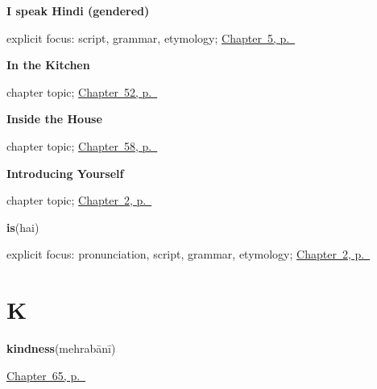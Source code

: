 \noindent\begin{minipage}[t]{\linewidth}
\raggedright
\textbf{I speak Hindi (gendered)}\enspace\emph{   }\par
\footnotesize explicit focus: script, grammar, etymology; \hyperref[ch:first-verbs]{Chapter~5, p.~\pageref*{ch:first-verbs}}
\end{minipage}\par\smallskip

\noindent\begin{minipage}[t]{\linewidth}
\raggedright
\textbf{In the Kitchen}\par
\footnotesize chapter topic; \hyperref[ch:hi-in-the-kitchen]{Chapter~52, p.~\pageref*{ch:hi-in-the-kitchen}}
\end{minipage}\par\smallskip

\noindent\begin{minipage}[t]{\linewidth}
\raggedright
\textbf{Inside the House}\par
\footnotesize chapter topic; \hyperref[ch:hi-inside-the-house]{Chapter~58, p.~\pageref*{ch:hi-inside-the-house}}
\end{minipage}\par\smallskip

\noindent\begin{minipage}[t]{\linewidth}
\raggedright
\textbf{Introducing Yourself}\par
\footnotesize chapter topic; \hyperref[ch:introductions]{Chapter~2, p.~\pageref*{ch:introductions}}
\end{minipage}\par\smallskip

\noindent\begin{minipage}[t]{\linewidth}
\raggedright
\textbf{is}\enspace\emph{}\enspace(hai)\par
\footnotesize explicit focus: pronunciation, script, grammar, etymology; \hyperref[ch:introductions]{Chapter~2, p.~\pageref*{ch:introductions}}
\end{minipage}\par\smallskip

\section*{K}

\noindent\begin{minipage}[t]{\linewidth}
\raggedright
\textbf{kindness}\enspace\emph{}\enspace(mehrabānī)\par
\footnotesize \hyperref[ch:hi-asking-nicely]{Chapter~65, p.~\pageref*{ch:hi-asking-nicely}}
\end{minipage}\par\smallskip

